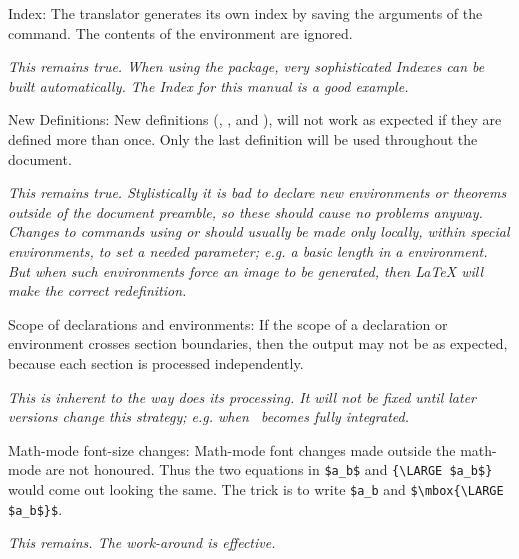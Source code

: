 \begin{htmllist}
\item [Index: ]
The translator generates its own index by saving the arguments  of 
the  command. The contents of the 
environment are ignored.
\begin{changebar}
\newline\textit
{This remains true. When using the  package,
very sophisticated Indexes can be built automatically.
The Index for this manual is a good example.}
\end{changebar}

\item[New Definitions:\index{extensions!definitions} ]
New definitions (, , 
 and ),
will not work as expected if they are defined more than once.
Only the last definition will be used throughout the document.
\begin{changebar}
\newline\textit
{This remains true. Stylistically it is bad to declare new
environments or theorems outside of the document preamble,
so these should cause no problems anyway.\html{\\}
Changes to commands using  or 
should usually be made only locally, within special environments,
to set a needed parameter; 
e.g. a basic length in a  environment.
But when such environments force an image to be generated,
then \LaTeX{} will make the correct redefinition.}
\end{changebar}

\item [Scope of declarations and environments: ]
If the scope of a declaration or environment crosses section
boundaries, then the output may not be as expected, because each
section is processed independently.
\begin{changebar}
\newline\textit
{This is inherent to the way \latextohtml{} does its processing. 
It will not be fixed until later versions change this strategy;
e.g. when \latextohtmlNG\ becomes fully integrated.}
\end{changebar}

\item [Math-mode font-size changes: ]  Math-mode font changes
made outside the math-mode are not honoured.  Thus the two equations
in \verb|$a_b$| and \verb|{\LARGE $a_b$}|
would come out looking the same.  The trick is to write
\verb|$a_b| and \verb|$\mbox{\LARGE $a_b$}$|.
\begin{changebar}
\newline\textit
{This remains. The work-around is effective.}
\end{changebar}
\end{htmllist}



